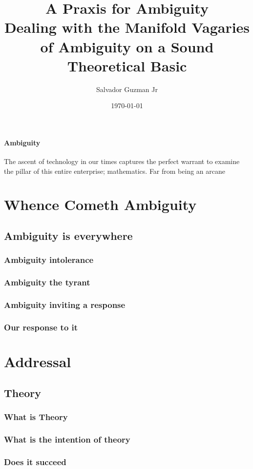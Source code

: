 \documentclass[UTF8]{article}
\title{%
	A Praxis for Ambiguity\\
	\large Dealing with the Manifold Vagaries of Ambiguity on a Sound Theoretical Basic
}
\author{Salvador Guzman Jr}
\date{\today}
\begin{document}
	\maketitle
	\tableofcontents
	
	\paragraph{Ambiguity}
	The ascent of technology in our times captures the perfect warrant to examine the pillar of this entire enterprise; mathematics. Far from being an arcane 
	
	\section{Whence Cometh Ambiguity}
	\subsection{Ambiguity is everywhere}
	\subsubsection{Ambiguity intolerance}
	\subsubsection{Ambiguity the tyrant}
	\subsubsection{Ambiguity inviting a response}
	\subsubsection{Our response to it}
	\section{Addressal}
	\subsection{Theory}
	\subsubsection{What is Theory}
	\subsubsection{What is the intention of theory}
	\subsubsection{Does it succeed}
\end{document}
